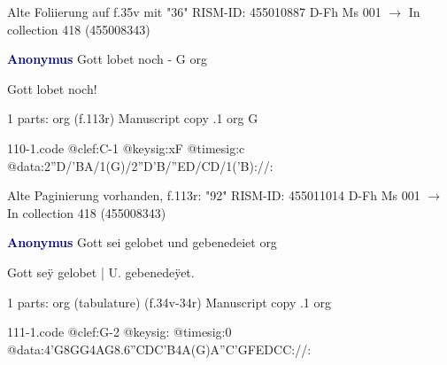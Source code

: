\documentclass[twocolumn]{book}
\begin{document}
\newline Alte Foliierung auf f.35v mit "36"
\newline RISM-ID: 455010887
\newline D-Fh  Ms 001
\newline $\rightarrow$ In collection 418 (455008343)
      
\newline \par \vspace{7pt} \textcolor{darkblue}{\textbf{Anonymus  }}
\newline Gott lobet noch - G
\newline org
\newline \begin{itshape}[f.113r, heading:] Gott lobet noch!\end{itshape} 
\newline \textcolor{darkblue}{}  1 parts: org  (f.113r)
\newline Manuscript copy
.1  org  G  
\begin{filecontents*}{110-1.code}
@clef:C-1
@keysig:xF
@timesig:c
@data:2''D/'BA/1(G)/2''D'B/''ED/CD/1('B)://:
\end{filecontents*}
\newline
%

\newline Alte Paginierung vorhanden, f.113r: "92"
\newline RISM-ID: 455011014
\newline D-Fh  Ms 001
\newline $\rightarrow$ In collection 418 (455008343)
      
\newline \par \vspace{7pt} \textcolor{darkblue}{\textbf{Anonymus  }}
\newline Gott sei gelobet und gebenedeiet
\newline org
\newline \begin{itshape}[f.34v, at left:] Gott seÿ gelobet | U. gebenedeÿet.\end{itshape} 
\newline \textcolor{darkblue}{}  1 parts: org (tabulature)  (f.34v-34r)
\newline Manuscript copy
.1  org  
\begin{filecontents*}{111-1.code}
@clef:G-2
@keysig:
@timesig:0
@data:4'G{8GG}4AG{8.6''CDC'B}4A(G)A''C'GFEDCC://:
\end{filecontents*}
\newline
%
\end{document}
